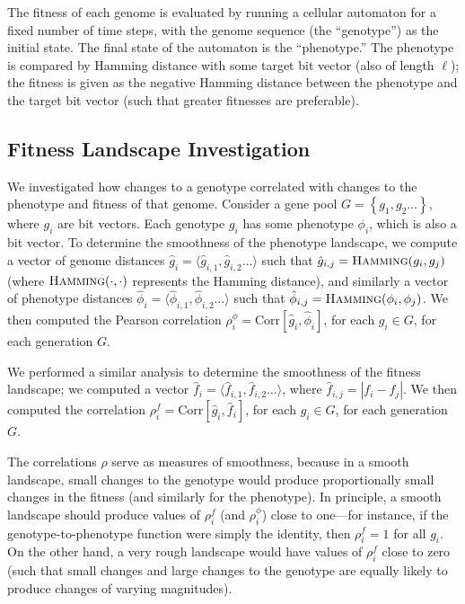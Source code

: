 \documentclass[twocolumn]{article}
\newcommand{\set}[1]{\left\{#1\right\}}
\newcommand{\seq}[1]{\langle #1 \rangle}
\newcommand{\hamming}[2]{\textsc{Hamming}(#1, #2)}
\newcommand{\corr}[2]{\text{Corr}\left[#1, #2\right]}
\begin{document}
The fitness of each genome is evaluated by running a cellular automaton for a fixed number of time steps, with the genome sequence (the ``genotype'') as the initial state. The final state of the automaton is the ``phenotype.'' The phenotype is compared by Hamming distance with some target bit vector (also of length $\ell$); the fitness is given as the negative Hamming distance between the phenotype and the target bit vector (such that greater fitnesses are preferable). 

\subsection{Fitness Landscape Investigation}

We investigated how changes to a genotype correlated with changes to the phenotype and fitness of that genome. Consider a gene pool $G = \set{g_1, g_2 \ldots}$, where $g_i$ are bit vectors. Each genotype $g_i$ has some phenotype $\phi_i$, which is also a bit vector. To determine the smoothness of the phenotype landscape, we compute a vector of genome distances $\hat{g}_i = \seq{\hat{g}_{i,1}, \hat{g}_{i,2} \ldots}$ such that $\hat{g}_{i,j} = \hamming{g_i}{g_j}$ (where $\hamming{\cdot}{\cdot}$ represents the Hamming distance), and similarly a vector of phenotype distances $\hat{\phi}_i = \seq{\hat{\phi}_{i,1}, \hat{\phi}_{i,2} \ldots}$ such that $\hat{\phi}_{i,j} = \hamming{\phi_i}{\phi_j}$. We then computed the Pearson correlation $\rho_i^\phi = \corr{\hat{g}_i}{\hat{\phi}_i}$, for each $g_i \in G$, for each generation $G$.

We performed a similar analysis to determine the smoothness of the fitness landscape; we computed a vector $\hat{f}_i = \seq{\hat{f}_{i,1}, \hat{f}_{i,2} \ldots}$, where $\hat{f}_{i,j} = |f_i - f_j|$. We then computed the correlation $\rho_i^f = \corr{\hat{g}_i}{\hat{f}_i}$, for each $g_i \in G$, for each generation $G$. 

The correlations $\rho$ serve as measures of smoothness, because in a smooth landscape, small changes to the genotype would produce proportionally small changes in the fitness (and similarly for the phenotype). In principle, a smooth landscape should produce values of $\rho_i^f$ (and $\rho_i^\phi$) close to one---for instance, if the genotype-to-phenotype function were simply the identity, then $\rho_i^f = 1$ for all $g_i$. On the other hand, a very rough landscape would have values of $\rho_i^f$ close to zero (such that small changes and large changes to the genotype are equally likely to produce changes of varying magnitudes).
\end{document}
